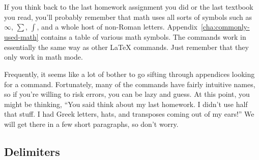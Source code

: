 If you think back to the last homework assignment you did or the last
textbook you read, you'll probably remember that math uses all sorts
of symbols such as $\infty$, $\sum$, $\int$, and a whole host of
non-Roman letters.  Appendix~\ref{cha:commonly-used-math} contains a
table of various math symbols.  The commands work in essentially the
same way as other \LaTeX{} commands.  Just remember that they only
work in math mode.

Frequently, it seems like a lot of bother to go sifting through
appendices looking for a command.  Fortunately, many of the commands
have fairly intuitive names, so if you're willing to risk errors, you
can be lazy and guess.  At this point, you might be thinking, ``You
said think about my last homework.  I didn't use half that stuff.  I
had Greek letters, hats, and transposes coming out of my ears!''  We
will get there in a few short paragraphs, so don't worry.

\subsection{Delimiters}
\label{sec:delimiters}

